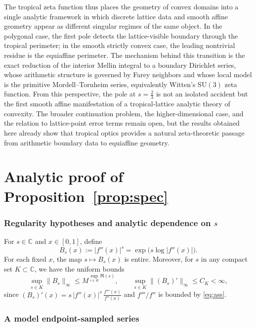 \documentclass[a4paper,american,11pt]{amsart}
\theoremstyle{plain}
\theoremstyle{definition}
\newcommand{\C}{\mathbb C}
\begin{document}
The tropical zeta function thus places the geometry of convex domains into a single analytic framework in which discrete lattice data and smooth affine geometry appear as different singular regimes of the same object. In the polygonal case, the first pole detects the lattice-visible boundary through the tropical perimeter; in the smooth strictly convex case, the leading nontrivial residue is the equiaffine perimeter. The mechanism behind this transition is the exact reduction of the interior Mellin integral to a boundary Dirichlet series, whose arithmetic structure is governed by Farey neighbors and whose local model is the primitive Mordell--Tornheim series, equivalently Witten's \(\mathrm{SU}(3)\) zeta function. From this perspective, the pole at \(s=\tfrac23\) is not an isolated accident but the first smooth affine manifestation of a tropical-lattice analytic theory of convexity. The broader continuation problem, the higher-dimensional case, and the relation to lattice-point error terms remain open, but the results obtained here already show that tropical optics provides a natural zeta-theoretic passage from arithmetic boundary data to equiaffine geometry.

\section{Analytic proof of Proposition~\ref{prop:spec}}\label{app3}

\subsubsection{Regularity hypotheses and analytic dependence on \(s\)}


For \(s\in\C\) and \(x\in[0,1]\), define
\[
B_s(x):=|f''(x)|^s=\exp\bigl(s\log|f''(x)|\bigr).
\]
For each fixed \(x\), the map \(s\mapsto B_s(x)\) is entire. Moreover, for \(s\) in any compact set \(K\subset\C\), we have the uniform bounds
\begin{equation}
\label{eq:Bs_bounds}
\sup_{s\in K}\|B_s\|_{\infty}\le M^{\sup_{s\in K}\Re(s)},\qquad
\sup_{s\in K}\|(B_s)'\|_{\infty}\le C_K<\infty,
\end{equation}
since
\((B_s)'(x)=s\,|f''(x)|^s\,\frac{f'''(x)}{f''(x)}\)
and $f'''/f''$ is bounded by \eqref{eq:ass}.

\subsubsection{A model endpoint-sampled series}
\end{document}

